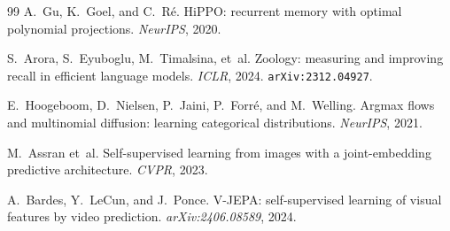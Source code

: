 \begin{thebibliography}{99}
A.~Gu, K.~Goel, and C.~R{\'e}.
\newblock HiPPO: recurrent memory with optimal polynomial projections.
\newblock \emph{NeurIPS}, 2020.

S.~Arora, S.~Eyuboglu, M.~Timalsina, et~al.
\newblock Zoology: measuring and improving recall in efficient language models.
\newblock \emph{ICLR}, 2024.
\newblock \texttt{arXiv:2312.04927}.

E.~Hoogeboom, D.~Nielsen, P.~Jaini, P.~Forr{\'e}, and M.~Welling.
\newblock Argmax flows and multinomial diffusion: learning categorical distributions.
\newblock \emph{NeurIPS}, 2021.

M.~Assran et~al.
\newblock Self-supervised learning from images with a joint-embedding predictive architecture.
\newblock \emph{CVPR}, 2023.

A.~Bardes, Y.~LeCun, and J.~Ponce.
\newblock V-JEPA: self-supervised learning of visual features by video prediction.
\newblock \emph{arXiv:2406.08589}, 2024.

\end{thebibliography}
